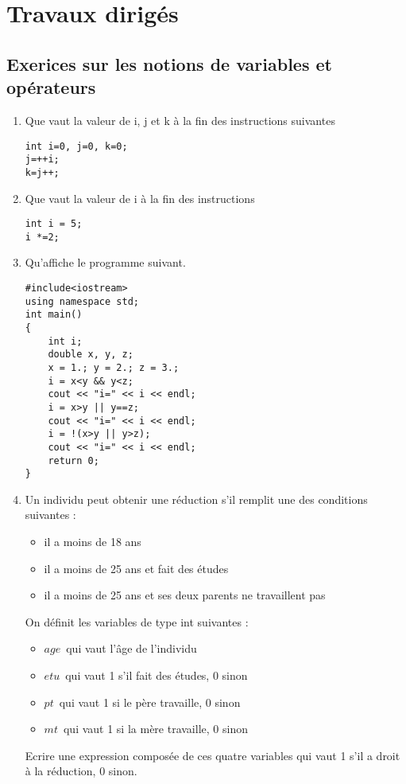 \documentclass[a4paper, oneside,11pt]{book}
\begin{document}
\newpage

\chapter{Travaux dirig\'es}
\pagestyle{fancy}
\renewcommand{\chaptermark}[1]{\markboth{#1}{}}
 \rhead{\thepage}

\section{Exerices sur les notions de variables et op\'erateurs}
\begin{enumerate}
\item Que vaut la valeur de i, j et k \`a la fin des instructions suivantes
\begin{verbatim}
int i=0, j=0, k=0;
j=++i;
k=j++;
\end{verbatim}
\item Que vaut la valeur de i \`a la fin des instructions
\begin{verbatim}
int i = 5;
i *=2;
\end{verbatim}

\item Qu'affiche le programme suivant.
\begin{lstlisting}
#include<iostream>
using namespace std;
int main() 
{
    int i;
    double x, y, z;
    x = 1.; y = 2.; z = 3.;
    i = x<y && y<z; 
    cout << "i=" << i << endl;
    i = x>y || y==z; 
    cout << "i=" << i << endl;
    i = !(x>y || y>z); 
    cout << "i=" << i << endl;
    return 0;
}
\end{lstlisting}
\item Un individu peut obtenir une r\'eduction s'il remplit une des conditions suivantes :
\begin{itemize}
\item il a moins de 18 ans
\item il a moins de 25 ans et fait des \'etudes
\item il a moins de 25 ans et ses deux parents ne travaillent pas
\end{itemize}

On d\'efinit les variables de type int suivantes :
\begin{itemize}
\item[]$age$\ qui vaut l'\^age de l'individu
\item[]$etu$\ qui vaut 1 s'il fait des \'etudes, 0 sinon
\item[]$pt$\ qui vaut 1 si le p\`ere travaille, 0 sinon
\item[]$mt$\ qui vaut 1 si la m\`ere travaille, 0 sinon
\end{itemize}
Ecrire une expression compos\'ee de ces quatre variables qui vaut 1 s'il a droit \`a
la r\'eduction, 0 sinon.


\end{enumerate}
\end{document}
